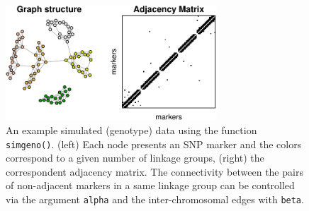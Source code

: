 \begin{figure}[t]
	\centering
	\includegraphics[width=0.7\textwidth]{Fig2.pdf}
	\caption{An example simulated (genotype) data using the function {\tt simgeno()}. (left) Each node presents an SNP marker and the colors correspond to a given number of linkage groups, (right) the correspondent adjacency matrix. The connectivity between the pairs of non-adjacent markers in a same linkage group can be controlled via the argument {\tt alpha} and the inter-chromosomal edges with {\tt beta}.	
	} 
\label{FigSim}   
\end{figure}


